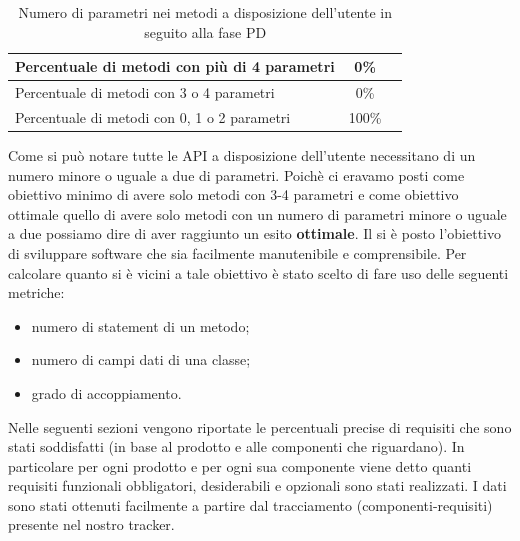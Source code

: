 				\begin{table}[H]
					\centering
					\begin{tabu}{| l | c | c |}
						\hline
						Percentuale di metodi con più di 4 parametri   & 0\% \\ \hline
						Percentuale di metodi con 3 o 4 parametri      & 0\% \\ \hline
						Percentuale di metodi con 0, 1 o 2 parametri   & 100\% \\ \hline
					\end{tabu}
					\caption{Numero di parametri nei metodi a disposizione dell'utente in seguito alla fase PD}
				\end{table}
				Come si può notare tutte le API a disposizione dell'utente necessitano di un numero minore o uguale a due di parametri. Poichè ci eravamo posti come obiettivo minimo di avere solo metodi con 3-4 parametri e come obiettivo ottimale quello di avere solo metodi con un numero di parametri minore o uguale a due possiamo dire di aver raggiunto un esito \textbf{ottimale}.
				Il \groupname si è posto l'obiettivo di sviluppare software che sia facilmente manutenibile e comprensibile. Per calcolare quanto si è vicini a tale obiettivo è stato scelto di fare uso delle seguenti metriche:
				\begin{itemize}
					\item numero di statement di un metodo;
					\item numero di campi dati di una classe;
					\item grado di accoppiamento.
				\end{itemize}
				



				Nelle seguenti sezioni vengono riportate le percentuali precise di requisiti che sono stati soddisfatti (in base al prodotto e alle componenti che riguardano). In particolare per ogni prodotto e per ogni sua componente viene detto quanti requisiti funzionali obbligatori, desiderabili e opzionali sono stati realizzati. I dati sono stati ottenuti facilmente a partire dal tracciamento (componenti-requisiti) presente nel nostro tracker.

